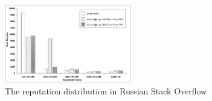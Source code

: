 \begin{figure}
	\includegraphics[width = 0.49\textwidth]{figures/reputation.png}
	\caption{The reputation distribution in Russian Stack Overflow}
	\label{fig:reputationDistribution}
\end{figure} 




